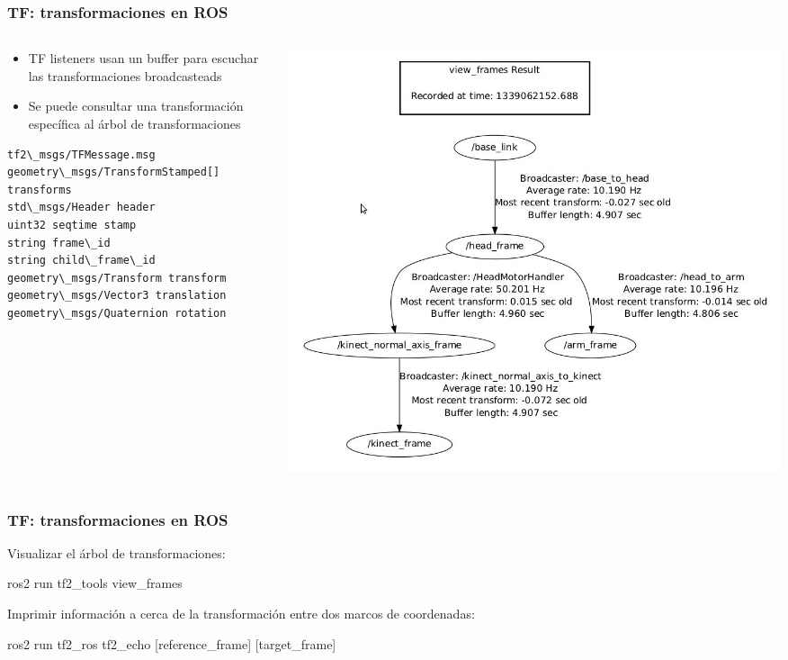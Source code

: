 \begin{frame}[fragile]
    \frametitle{TF: transformaciones en ROS}
    \footnotesize
        \begin{columns}
    	\begin{column}{0.5\textwidth}
		    \begin{itemize}
				\item TF listeners usan un buffer para escuchar las transformaciones broadcasteads
				\item Se puede consultar una transformación específica al árbol de transformaciones
			\end{itemize}
\begin{lstlisting}[style=bash] 
tf2\_msgs/TFMessage.msg
geometry\_msgs/TransformStamped[] transforms
std\_msgs/Header header
uint32 seqtime stamp
string frame\_id
string child\_frame\_id
geometry\_msgs/Transform transform
geometry\_msgs/Vector3 translation
geometry\_msgs/Quaternion rotation
\end{lstlisting}
    	\end{column}
    	\begin{column}{0.5\textwidth}
    		\includegraphics[width=\columnwidth]{images/tf2_tree_graph.png}
    	\end{column}
    \end{columns}
\end{frame}

\begin{frame}
    \frametitle{TF: transformaciones en ROS}
    
    Visualizar el árbol de transformaciones:
    
    ros2 run tf2\_tools view\_frames
    
    Imprimir información a cerca de la transformación entre dos marcos de coordenadas:
    
    ros2 run tf2\_ros tf2\_echo [reference\_frame] [target\_frame]
   
\end{frame}

